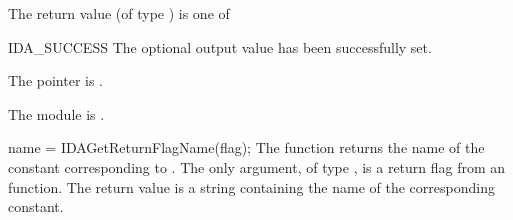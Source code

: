 {{\begin{args}[nncfails]
  \end{args}
}
{
  The return value  (of type ) is one of
  \begin{args}
  \item[IDA\_SUCCESS]
    The optional output value has been successfully set.
  \item[\Id{IDA\_MEM\_NULL}]
    The  pointer is .
  \item[\Id{IDA\_MEM\_FAIL}]
    The {\sunnonlinsol} module is .
  \end{args}
}
{}
{
  name = IDAGetReturnFlagName(flag);
}
{
  The function  returns the
  name of the {\ida} constant corresponding to .
}
{
  The only argument, of type , is a return flag from an {\ida} function.
}
{
  The return value is a string containing the name of the corresponding constant.
}
{}
}

